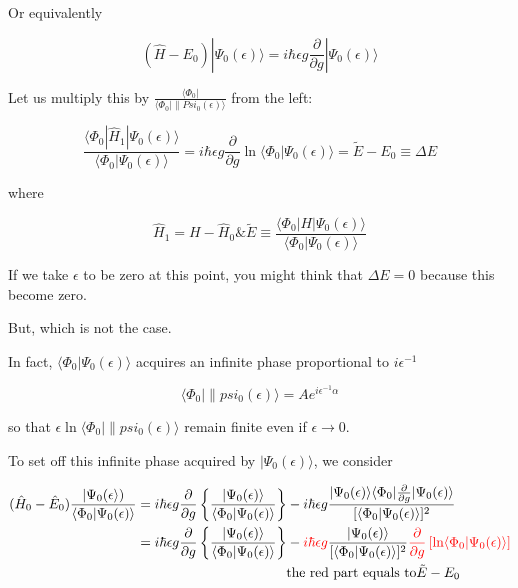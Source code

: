 ﻿\documentclass[twoside]{book}
\numberwithin{equation}{section}
\begin{document}
Or equivalently

\[(\hat{H}-E_0)|\Psi_0(\epsilon)\rangle = i\hbar\epsilon g\frac{\partial}{\partial g}|\Psi_0(\epsilon)\rangle \]

Let us multiply this by $\displaystyle\frac{\langle\Phi_0|}{\langle\Phi_0|\|Psi_0(\epsilon)\rangle}$ from the left: 

\[\frac{\langle\Phi_0|\hat{H}_1|\Psi_0(\epsilon)\rangle}{\langle\Phi_0|\Psi_0(\epsilon)\rangle} = i\hbar\epsilon g\frac{\partial}{\partial g}\ln\langle\Phi_0|\Psi_0(\epsilon)\rangle = \tilde{E}-E_0\equiv\Delta E \]

where

\[\hat{H}_1 = H-\hat{H}_0 \& \tilde{E} \equiv\frac{\langle\Phi_0|H|\Psi_0(\epsilon)\rangle}{\langle\Phi_0|\Psi_0(\epsilon)\rangle} \]

If we take $\epsilon$ to be zero at this point, you might think that $\Delta E=0$ because this become zero. 

But, which is not the case. 

In fact, $\langle\Phi_0|\Psi_0(\epsilon)\rangle$ acquires an infinite phase proportional to $i\epsilon^{-1}$

\[\langle\Phi_0|\|psi_0(\epsilon)\rangle = A e^{i\epsilon^{-1}\alpha} \]

so that $\epsilon \ln \langle\Phi_0|\|psi_0(\epsilon)\rangle$ remain finite even if $\epsilon\to0$. 

To set off this infinite phase acquired by $|\Psi_0(\epsilon)\rangle$, we consider

\[
\begin{split}
(\hat{H}_0-\hat{E}_0)\frac{|\Psi_0(\epsilon\rangle)}{\langle\Phi_0|\Psi_0(\epsilon)\rangle} &= i\hbar\epsilon g\frac{\partial}{\partial g}\left\{\frac{|\Psi_0(\epsilon)\rangle}{\langle\Phi_0|\Psi_0(\epsilon)\rangle}\right\} - i\hbar\epsilon g\frac{|\Psi_0(\epsilon)\rangle\langle\Phi_0|\frac{\partial}{\partial g}|\Psi_0(\epsilon)\rangle}{[\langle\Phi_0|\Psi_0(\epsilon)\rangle]^2}\\
&=i\hbar\epsilon g\frac{\partial}{\partial g}\left\{\frac{|\Psi_0(\epsilon)\rangle}{\langle\Phi_0|\Psi_0(\epsilon)\rangle}\right\} - {{\color{red}{i\hbar\epsilon g}}}\frac{|\Psi_0(\epsilon)\rangle}{[\langle\Phi_0|\Psi_0(\epsilon)\rangle]^2}{{\color{red}{\frac{\partial}{\partial g}\left[\text{ln} \langle\Phi_0|\Psi_0(\epsilon)\rangle\right]}}}\\
&\quad\quad\quad\quad\quad\quad\quad\quad\quad\quad\quad{\text{the red part equals to}} \tilde{E}-E_0
\end{split}
\]
\end{document}

